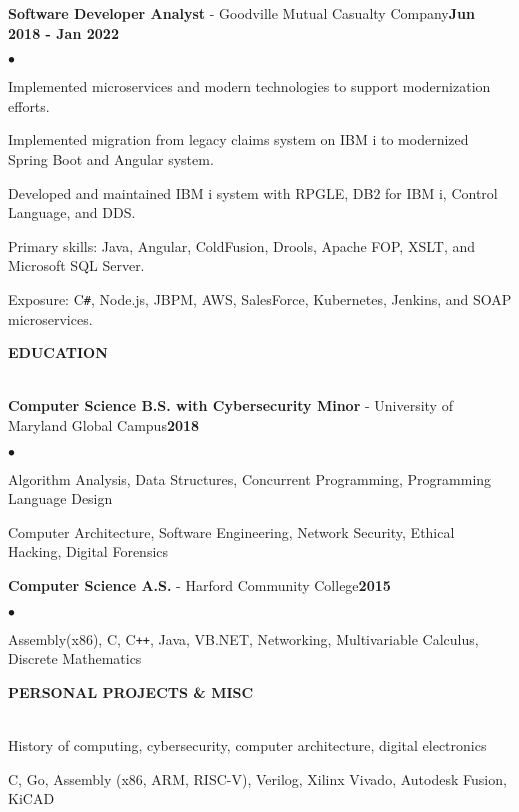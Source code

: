 \documentclass[a4paper]{article}
\newcommand{\resumeheader}[1]{
    \vspace*{8pt}
    \textbf{#1}\vspace*{-6pt}\vspace*{-4pt}\\ \hrulefill\\
    \vspace*{8pt}
}
\newcommand{\history}[3]{
    \textbf{#1} - #2\hfill\textbf{#3}
}
\newcommand{\interests}[2]{
    \textbf{\makebox[62pt][l]{#1}} #2\\\vspace*{6pt}
}
\newenvironment{resumelist}{
    \vspace*{4pt}
    \begin{list}
        {\small$\bullet$}{\topsep 0pt \itemsep -2pt \leftmargin=22pt}}{\vspace*{4pt}
    \end{list}
}
\begin{document}
        \history{Software Developer Analyst}{Goodville Mutual Casualty Company}{Jun 2018 - Jan 2022}
            \begin{resumelist}
                \item Implemented microservices and modern technologies to support modernization efforts.
                \item Implemented migration from legacy claims system on IBM i to modernized Spring Boot and Angular system.
                \item Developed and maintained IBM i system with RPGLE, DB2 for IBM i, Control Language, and DDS.
                \item Primary skills: Java, Angular, ColdFusion, Drools, Apache FOP, XSLT, and Microsoft SQL Server.
                \item Exposure: C\texttt{\#}, Node.js, JBPM, AWS, SalesForce, Kubernetes, Jenkins, and SOAP microservices.
            \end{resumelist}

    \resumeheader{EDUCATION}

        \history{Computer Science B.S. with Cybersecurity Minor}{University of Maryland Global Campus}{2018}
            \begin{resumelist}
                \item Algorithm Analysis, Data Structures, Concurrent Programming, Programming Language Design
                \item Computer Architecture, Software Engineering, Network Security, Ethical Hacking, Digital Forensics
            \end{resumelist}
        \vspace*{6pt}

        \history{Computer Science A.S.}{Harford Community College}{2015}
            \begin{resumelist}
                \item Assembly(x86), C, C\texttt{++}, Java, VB.NET, Networking, Multivariable Calculus, Discrete Mathematics
            \end{resumelist}
    
    \resumeheader{PERSONAL PROJECTS \& MISC}
        
        \interests{Interests:}{History of computing, cybersecurity, computer architecture, digital electronics}
        \interests{Self-Taught:}{C, Go, Assembly (x86, ARM, RISC-V), Verilog, Xilinx Vivado, Autodesk Fusion, KiCAD}
        \vspace*{12pt}
\end{document}

